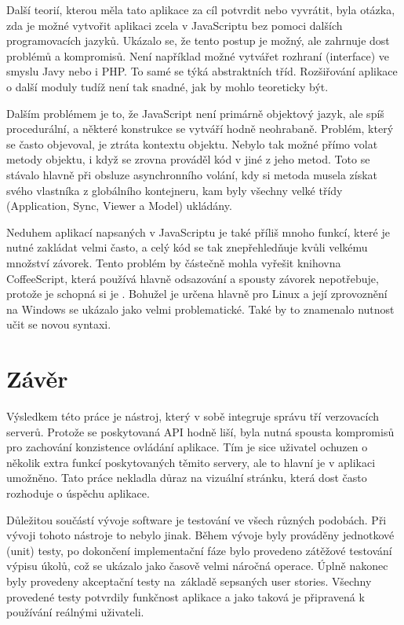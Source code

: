 Další teorií, kterou měla tato aplikace za cíl potvrdit nebo vyvrátit, byla otázka, zda je možné vytvořit aplikaci zcela v JavaScriptu bez pomoci dalších programovacích jazyků. Ukázalo se, že tento postup je možný, ale zahrnuje dost problémů a kompromisů. Není například možné vytvářet rozhraní (interface) ve smyslu Javy nebo i PHP. To samé se týká abstraktních tříd. Rozšiřování aplikace o další moduly tudíž není tak snadné, jak by mohlo teoreticky být.

Dalším problémem je to, že JavaScript není primárně objektový jazyk, ale spíš procedurální, a některé konstrukce se vytváří hodně neohrabaně. Problém, který se často objevoval, je ztráta kontextu objektu. Nebylo tak možné přímo volat metody objektu, i když se zrovna prováděl kód v jiné z jeho metod. Toto se stávalo hlavně při obsluze asynchronního volání, kdy si metoda musela získat svého vlastníka z globálního kontejneru, kam byly všechny velké třídy (Application, Sync, Viewer a Model) ukládány.

Neduhem aplikací napsaných v JavaScriptu je také příliš mnoho funkcí, které je nutné zakládat velmi často, a celý kód se tak znepřehledňuje kvůli velkému množství závorek. Tento problém by částečně mohla vyřešit knihovna CoffeeScript\cite{coffeescript}, která používá hlavně odsazování a spousty závorek nepotřebuje, protože je schopná si je . Bohužel je určena hlavně pro Linux a její zprovoznění na Windows se ukázalo jako velmi problematické. Také by to znamenalo nutnost učit se novou syntaxi.

\chapter{Závěr}

Výsledkem této práce je nástroj, který v sobě integruje správu tří verzovacích serverů. Protože se poskytovaná API hodně liší, byla nutná spousta kompromisů pro zachování konzistence ovládání aplikace. Tím je sice uživatel ochuzen o několik extra funkcí poskytovaných těmito servery, ale to hlavní je v aplikaci umožněno. Tato práce nekladla důraz na vizuální stránku, která dost často rozhoduje o úspěchu aplikace.

Důležitou součástí vývoje software je testování ve všech různých podobách. Při vývoji tohoto nástroje to nebylo jinak. Během vývoje byly prováděny jednotkové (unit) testy, po dokončení implementační fáze bylo provedeno zátěžové testování výpisu úkolů, což se ukázalo jako časově velmi náročná operace. Úplně nakonec byly provedeny akceptační testy na~základě sepsaných user stories. Všechny provedené testy potvrdily funkčnost aplikace a jako taková je připravená k používání reálnými uživateli.